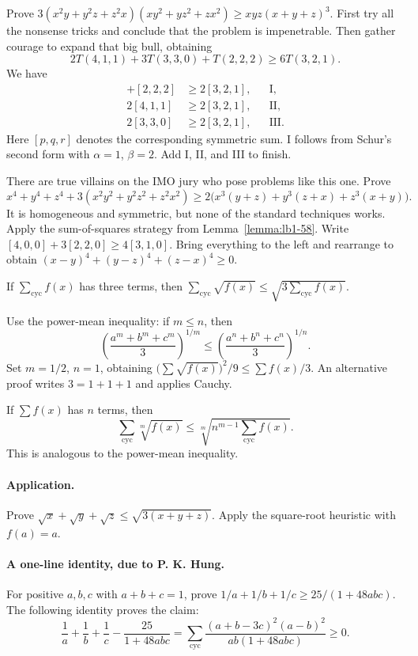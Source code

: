 \documentclass[11pt,a4paper]{article}
\begin{document}
Prove $3(x^2y+y^2z+z^2x)(xy^2+yz^2+zx^2)\geq xyz(x+y+z)^3$.
First try all the nonsense tricks and conclude that the problem is
impenetrable. Then gather courage to expand that big bull, obtaining
\[
2T(4,1,1)+3T(3,3,0)+T(2,2,2)\geq6T(3,2,1).
\]
We have
\begin{align*}
[3,3,0]+[2,2,2]&\geq2[3,2,1],&&\text{I},\\
2[4,1,1]&\geq2[3,2,1],&&\text{II},\\
2[3,3,0]&\geq2[3,2,1],&&\text{III}.
\end{align*}
Here $[p,q,r]$ denotes the corresponding symmetric sum.
I follows from Schur's second form with $\alpha=1$, $\beta=2$.
Add I, II, and III to finish.

There are true villains on the IMO jury who pose problems like this one.
Prove
\[
x^4+y^4+z^4+3(x^2y^2+y^2z^2+z^2x^2)
\geq2\bigl(x^3(y+z)+y^3(z+x)+z^3(x+y)\bigr).
\]
It is homogeneous and symmetric, but none of the standard techniques works.
Apply the sum-of-squares strategy from Lemma~\ref{lemma:lb1-58}.
Write $[4,0,0]+3[2,2,0]\geq4[3,1,0]$.
Bring everything to the left and rearrange to obtain
$(x-y)^4+(y-z)^4+(z-x)^4\geq0$.

\setcounter{theorem}{60}\begin{lemma}
If $\sum_{\mathrm{cyc}}f(x)$ has three terms, then
$\sum_{\mathrm{cyc}}\sqrt{f(x)}\leq\sqrt{3\sum_{\mathrm{cyc}}f(x)}$.
\end{lemma}
Use the power-mean inequality: if $m\leq n$, then
\[
\left(\frac{a^m+b^m+c^m}{3}\right)^{1/m}
\leq\left(\frac{a^n+b^n+c^n}{3}\right)^{1/n}.
\]
Set $m=1/2$, $n=1$, obtaining
$\bigl(\sum\sqrt{f(x)}\bigr)^2/9\leq\sum f(x)/3$.
An alternative proof writes $3=1+1+1$ and applies Cauchy.
\setcounter{theorem}{61}\begin{lemma}
If $\sum f(x)$ has $n$ terms, then
\[
\sum_{\mathrm{cyc}}\sqrt[m]{f(x)}\leq\sqrt[m]{n^{m-1}\sum_{\mathrm{cyc}}f(x)}.
\]
This is analogous to the power-mean inequality.
\end{lemma}
\paragraph{Application.}
Prove $\sqrt x+\sqrt y+\sqrt z\leq\sqrt{3(x+y+z)}$.
Apply the square-root heuristic with $f(a)=a$.

\paragraph{A one-line identity, due to P. K. Hung.}
For positive $a,b,c$ with $a+b+c=1$, prove
$1/a+1/b+1/c\geq25/(1+48abc)$.
The following identity proves the claim:
\[
\frac1a+\frac1b+\frac1c-\frac{25}{1+48abc}
=\sum_{\mathrm{cyc}}\frac{(a+b-3c)^2(a-b)^2}{ab(1+48abc)}\geq0.
\]
\end{document}
